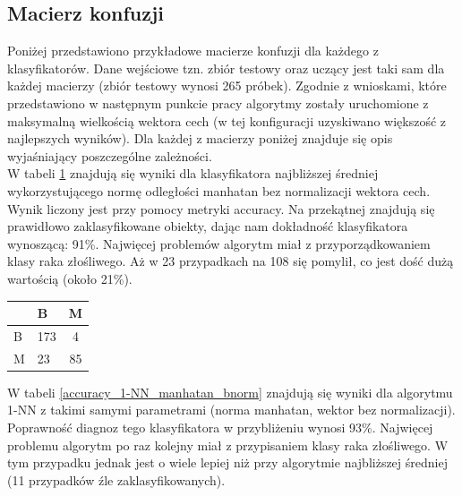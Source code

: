 \documentclass[12pt]{article}
\begin{document}
\subsection{Macierz konfuzji}
\indent Poniżej przedstawiono przykładowe macierze konfuzji dla każdego z klasyfikatorów. Dane wejściowe tzn. zbiór testowy oraz uczący jest taki sam dla każdej macierzy (zbiór testowy wynosi 265 próbek). Zgodnie z wnioskami, które przedstawiono w następnym punkcie pracy algorytmy zostały uruchomione z maksymalną wielkością wektora cech (w tej konfiguracji uzyskiwano większość z najlepszych wyników). Dla każdej z macierzy poniżej znajduje się opis wyjaśniający poszczególne zależności.\\
\indent W tabeli \ref{accuracy_nm_manhatan_bnorm} znajdują się wyniki dla klasyfikatora najbliższej średniej wykorzystującego normę odległości manhatan bez normalizacji wektora cech. Wynik liczony jest przy pomocy metryki accuracy. Na przekątnej znajdują się prawidłowo zaklasyfikowane obiekty, dając nam dokładność klasyfikatora wynoszącą: 91\%. Najwięcej problemów algorytm miał z przyporządkowaniem klasy raka złośliwego. Aż w 23 przypadkach na 108 się pomylił, co jest dość dużą wartością (około 21\%). 
\begin{table}[H]
\begin{center}
\label{accuracy_nm_manhatan_bnorm} 
\begin{LARGE}
\begin{tabular}{l|l|c|}
\cline{2-3}
                        & B & M \\ \hline
\multicolumn{1}{|l|}{B} & 173 & 4 \\ \hline
\multicolumn{1}{|l|}{M} & 23 & 85 \\ \hline
\end{tabular}
\end{LARGE}
\end{center}
\end{table}

\indent W tabeli \ref{accuracy_1-NN_manhatan_bnorm} znajdują się wyniki dla algorytmu 1-NN z takimi samymi parametrami (norma manhatan, wektor bez normalizacji). Poprawność diagnoz tego klasyfikatora w przybliżeniu wynosi 93\%. Najwięcej problemu algorytm po raz kolejny miał z przypisaniem klasy raka złośliwego. W tym przypadku jednak jest o wiele lepiej niż przy algorytmie najbliższej średniej (11 przypadków źle zaklasyfikowanych).
\end{document}
